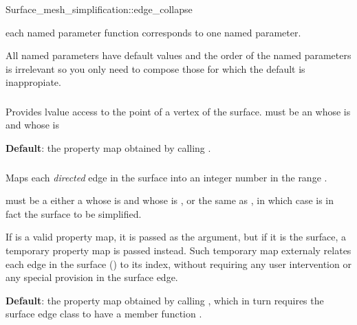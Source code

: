 \begin{ccRefFunction}{Surface_mesh_simplification::edge_collapse}

each named parameter function corresponds to one named parameter.

All named parameters have default values and the order of the named parameters 
is irrelevant so you only need to compose those for which the default
is inappropiate.

\subsubsection{ }

Provides lvalue access to the point of a vertex of the surface.
 must be an 
whose  is
and whose  is 

\textbf{Default}: the property map obtained by calling .


\subsubsection{ }

Maps each {\em directed} edge in the surface into an integer number
in the range \ccc{[0,num_edge(surface)}.

 must be a either a
whose  is
and whose  is 
,
or the same as , in which case 
 is in fact the surface to be simplified.

If  is a valid property map, it is
passed as the argument, but if it is the surface, a
temporary property map is passed instead.
Such temporary map externaly relates each edge 
in the surface () to its index,
without requiring any user intervention or any special
provision in the surface edge.

\textbf{Default}: the property map obtained by calling , which 
in turn requires the surface edge class to have a member function 
.


\end{ccRefFunction}
